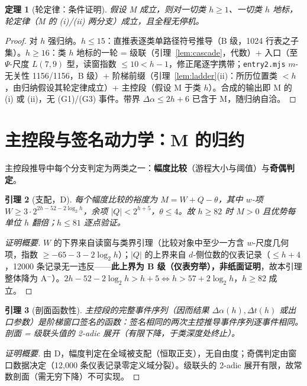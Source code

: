 \documentclass[11pt]{ctexart}
\newtheorem{theorem}{定理}[section]
\newtheorem{lemma}[theorem]{引理}
\theoremstyle{definition}
\begin{document}
\begin{theorem}[轮定律：条件证明]\label{thm:round}
假设 M 成立，则对一切类 $h\ge1$、一切类 $h$ 地标，轮定律（M 的 (i)/(ii) 两分支）成立，且全程无停机。
\end{theorem}
\begin{proof}
对 $h$ 强归纳。$h\le15$：直推表逐类单路径符号推导（B 级，1024 行表之子集）。$h\ge16$：类 $h$ 地标的一轮 = 级联（引理~\ref{lem:cascade}，代数）+ 入口（至 $\Psi$-尺度 $L(7,9)$ 型，读窗指数 $\le10<h{-}1$，修正尾逐字携带；\texttt{entry2.mjs} $m$-无关性 1156/1156，B 级）+ 阶梯前缀（引理~\ref{lem:ladder}(ii)：所历位置类 $<h$，由归纳假设其轮定律成立）+ 主控段（假设 M 于类 $h$）。合成的输出即 M 的 (i) 或 (ii)，无 (G1)/(G3) 事件。带界 $\Delta\alpha\le2h+6$ 已含于 M，随归纳自洽。
\end{proof}

\section{主控段与签名动力学：M 的归约}\label{sec:reduce}

主控段推导中每个分支判定为两类之一：\textbf{幅度比较}（游程大小与阈值）与\textbf{奇偶判定}。

\begin{lemma}[支配，D]\label{lem:dom}
每个幅度比较的裕度为 $M=W+Q-\theta$，其中 $w$-项 $W\ge3\cdot2^{2h-52-2\log_2 h}$，余项 $|Q|<2^{h+5}$，$\theta\le4$。故 $h\ge82$ 时 $M>0$ 且优势每单位 $h$ 翻倍；$h\le81$ 逐点验证。
\end{lemma}
\begin{proof}[证明概要]
$W$ 的下界来自读窗与类界引理（比较对象中至少一方含 $w$-尺度几何项，指数 $\ge-65-3-2\log_2 h$）；$|Q|$ 的上界来自 $d$-侧位数的仪表记录（$\le h{+}4$，12000 条记录无一违反——\textbf{此上界为 B 级（仪表穷举），非纸面证明}，故本引理整体降为 A$^-$）。$2h-52-2\log_2h>h+5\iff h>57+2\log_2h$，$h\ge82$ 成立。
\end{proof}

\begin{lemma}[剖面函数性]\label{lem:profile}
主控段的完整事件序列（因而结果 $\Delta\alpha(h),\Delta t(h)$ 或出口参数）是阶梯窗口签名的函数：签名相同的两次主控推导事件序列逐事件相同。剖面 = 级联头值的 2-adic 展开（有限下降，于类深度处终止）。
\end{lemma}
\begin{proof}[证明概要]
由 D，幅度判定在全域被支配（恒取正支），无自由度；奇偶判定由窗口数据决定（12{,}000 条仪表记录零定义域分裂）。级联头的 2-adic 展开有限，故常数剖面（需无穷下降）不可实现。
\end{proof}
\end{document}
